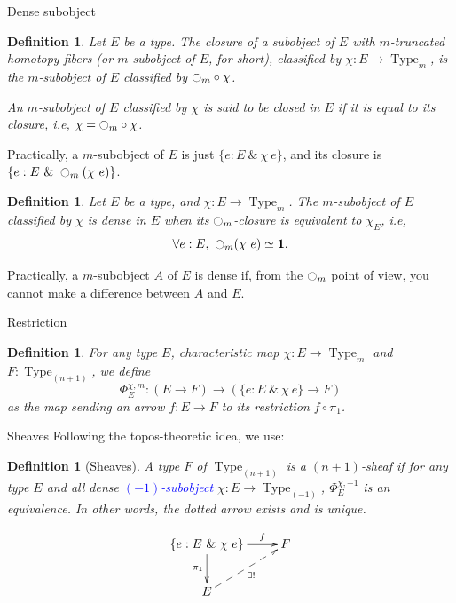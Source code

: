 \documentclass{beamer}
\newtheorem{defi}[thm]{Definition}
\newcommand{\ie}{i.e,\xspace}
\DeclareMathOperator{\Type}{Type}
\newcommand{\modal}{\ensuremath{\ocircle}}
\newcommand \one {\mathbf{1}}
\newcommand{\nType}[1]{\Type_{#1}}
\begin{document}
\begin{frame}[allowframebreaks]{Dense subobject}
  \note{ }
  \begin{defi}
    Let $E$ be a type. The {\em closure} of a subobject of $E$ with
    $m$-truncated homotopy fibers (or $m$-subobject of $E$, for short),
    classified by $\chi : E \to \nType m$, is the $m$-subobject of $E$
    classified by $\modal_m \circ \chi$.


    An $m$-subobject of $E$ classified by $\chi$ is said to be {\em
      closed in $E$} if it is equal to its closure, \ie
    $\chi = \modal_m \circ \chi$.
  \end{defi}

  Practically, a $m$-subobject of $E$ is just $\{e:E ~\&~ \chi~e\}$, and
  its closure is $\{e:E~\&~\modal_m(\chi~e)\}$.
  \framebreak
  \begin{defi}
    Let $E$ be a type, and $\chi:E \to \nType m$. The $m$-subobject of $E$
    classified by $\chi$ is {\em dense} in $E$ when its $\modal_m$-closure
    is equivalent to $\chi_E$, \ie
    $$\forall e:E,~ \modal_m  (\chi~e) \simeq \one.$$
  \end{defi}

  Practically, a $m$-subobject $A$ of $E$ is dense if, from the $\modal_m$ point of
  view, you cannot make a difference between $A$ and $E$.
  
\end{frame}

\begin{frame}{Restriction}
  \note{ }
  \begin{defi}
    For any type $E$, characteristic map $\chi : E \to \nType m$ and $F:\nType {(n+1)}$, we define
    $$
    \Phi_E^{\chi,m} : (E \to F) \to (\{e:E~\&~\chi~e\} \to F) 
    $$
    as the map sending an
    arrow $f:E\to F$ to its restriction $f \circ \pi_1$.
  \end{defi}
\end{frame}

\begin{frame}{Sheaves}
  Following the topos-theoretic idea, we use:
  \begin{defi}[Sheaves]
    A type $F$ of $\nType {(n+1)}$ is a {\em $(n+1)$-sheaf} if for any type $E$ and all dense \textcolor{blue}{$(-1)$-subobject}
    $\chi : E \to \nType {(-1)}$, $\Phi_E^{\chi,-1}$ is an
    equivalence. In other words, the dotted arrow exists and is unique.

    $$\xymatrix{
      \{e:E~\&~\chi~e\}  \ar[r]^-f \ar[d]_{\pi_1} & F \\
      E \ar@{-->}[ru]_{\exists !}&
    }$$
  \end{defi}
\end{frame}
\end{document}
